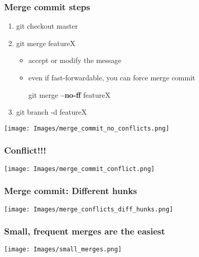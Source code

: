 \documentclass{beamer}
\begin{document}
	\begin{frame}[plain]
		\frametitle{Merge commit steps}
		\begin{enumerate}
			\item git checkout master
			\item git merge featureX
				\begin{itemize}
					\item accept or modify the message
					\item even if fast-forwardable, you can force merge commit \\
					\begin{center}
						git merge \textbf{--no-ff} featureX
					\end{center}
				\end{itemize}
			\item git branch -d featureX
		\end{enumerate}
		
		\begin{center}
			\texttt{[image: Images/merge\_commit\_no\_conflicts.png]}
		\end{center}
	
	\end{frame}

	\begin{frame}[plain]
		\frametitle{Conflict!!!}
	
		\begin{center}
			\texttt{[image: Images/merge\_commit\_conflict.png]}
		\end{center}
	
	\end{frame}

	\begin{frame}[plain]
		\frametitle{Merge commit: Different hunks}
		
		\begin{center}
			\texttt{[image: Images/merge\_conflicts\_diff\_hunks.png]}
		\end{center}
		
	
	\end{frame}

	\begin{frame}[plain]
		\frametitle{Small, frequent merges are the easiest}
		\begin{center}
			\texttt{[image: Images/small\_merges.png]}
		\end{center}
	
	\end{frame}
\end{document}
